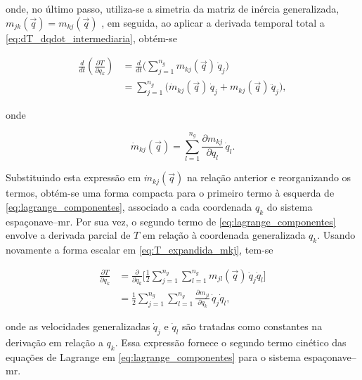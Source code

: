 onde, no último passo, utiliza-se a simetria da matriz de inércia generalizada,
$m_{jk}(\vec q) = m_{kj}(\vec q)$ \cite{Geradin2004}, em seguida, ao aplicar a derivada temporal total a \eqref{eq:dT_dqdot_intermediaria}, obtém-se

\begin{equation}
\begin{aligned}
\frac{d}{dt}\!\left(\frac{\partial T}{\partial \dot q_k}\right)
&=
\frac{d}{dt}
\biggl(
\sum_{j=1}^{n_g}
m_{kj}(\vec q)\,\dot q_j
\biggr)
\\
&=
\sum_{j=1}^{n_g}
\bigl(
\dot m_{kj}(\vec q)\,\dot q_j
+
m_{kj}(\vec q)\,\ddot q_j
\bigr),
\end{aligned}
\end{equation}

onde

\begin{equation}
\dot m_{kj}(\vec q)
=
\sum_{l=1}^{n_g}
\frac{\partial m_{kj}}{\partial q_l}\,\dot q_l.
\end{equation}

Substituindo esta expressão em $\dot m_{kj}(\vec q)$ na relação anterior e
reorganizando os termos, obtém-se uma forma compacta para o primeiro termo
à esquerda de \eqref{eq:lagrange_componentes}, associado a cada coordenada
$q_k$ do sistema espaçonave--\gls{mr}.
Por sua vez, o segundo termo de \eqref{eq:lagrange_componentes} envolve a
derivada parcial de $T$ em relação à coordenada generalizada $q_k$. Usando
novamente a forma escalar em \eqref{eq:T_expandida_mkj}, tem-se

\begin{equation}
\begin{aligned}
\frac{\partial T}{\partial q_k}
&=
\frac{\partial}{\partial q_k}
\biggl[
\frac{1}{2}
\sum_{j=1}^{n_g}\sum_{l=1}^{n_g}
m_{jl}(\vec q)\,\dot q_j \dot q_l
\biggr]
\\
&=
\frac{1}{2}
\sum_{j=1}^{n_g}\sum_{l=1}^{n_g}
\frac{\partial m_{jl}}{\partial q_k}\,\dot q_j \dot q_l,
\end{aligned}
\end{equation}

onde as velocidades generalizadas $\dot q_j$ e $\dot q_l$ são tratadas como constantes na derivação em
relação a $q_k$. Essa expressão fornece o segundo termo cinético das equações de Lagrange em
\eqref{eq:lagrange_componentes} para o sistema espaçonave--\gls{mr}.



